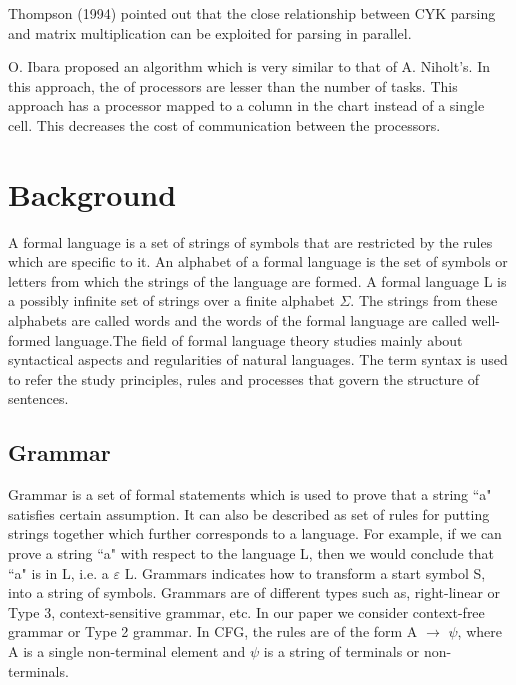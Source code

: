 \documentclass[12pt]{article}
\begin{document}
\vspace{2 mm}
 
Thompson (1994) pointed out that the close relationship between CYK parsing and matrix multiplication can be exploited for parsing in parallel.


\vspace{2 mm}
O. Ibara \cite{d}proposed an algorithm which is very similar to that of A. Niholt’s. In this approach, the of processors are lesser than the number of tasks. This approach has a processor mapped to a column in the chart instead of a single cell. This decreases the cost of communication between the processors.



\section{Background}
A formal language is a set of strings of symbols that are restricted by the rules which are specific to it. An alphabet of a formal language is the set of symbols or letters from which the strings of the language are formed. A formal language L is a possibly infinite set of strings over a finite alphabet $\Sigma$. The strings from these alphabets are called words and the words of the formal language are called well-formed language.\cite{e}The field of formal language theory studies mainly about syntactical aspects and regularities of natural languages.  The term syntax is used to refer the study principles, rules and processes that govern the structure of sentences. 
\subsection{Grammar}
Grammar is a set of formal statements which is used to prove that a string ``a" satisfies certain  assumption. It can also be described as set of rules for putting strings together which further corresponds to a language. For example, if we can prove a string ``a" with respect to the language L, then we would conclude that ``a" is in L, i.e. a $\varepsilon$ L. Grammars indicates how to transform a start symbol S, into a string of symbols. Grammars are of different types such as, right-linear or Type 3, context-sensitive grammar, etc. In our paper we consider context-free grammar or Type 2 grammar. In CFG, the rules are of the form A $\rightarrow$ $\psi$, where A is a single non-terminal element and $\psi$  is a string of terminals or non-terminals.
\end{document}
